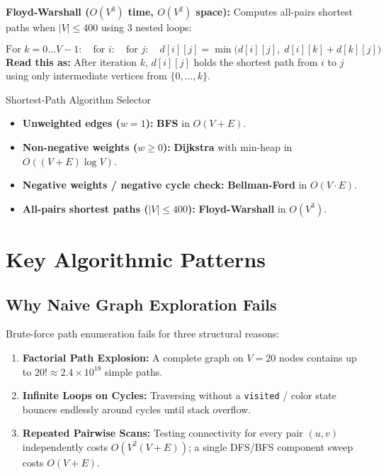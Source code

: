 \documentclass[11pt,a4paper]{article}
\theoremstyle{definition}
\begin{document}
\textbf{Floyd-Warshall ($O(V^3)$ time, $O(V^2)$ space):} Computes all-pairs shortest paths when $|V| \le 400$ using 3 nested loops:
\begin{formulabox}
$$\text{For } k = 0 \dots V-1:\quad \text{for } i:\quad \text{for } j:\quad d[i][j] = \min\big(d[i][j],\; d[i][k] + d[k][j]\big)$$
\textbf{Read this as:} After iteration $k$, $d[i][j]$ holds the shortest path from $i$ to $j$ using only intermediate vertices from $\{0, \dots, k\}$.
\end{formulabox}

\begin{calloutbox}{Shortest-Path Algorithm Selector}
\begin{itemize}
    \item \textbf{Unweighted edges ($w = 1$):} \textbf{BFS} in $O(V + E)$.
    \item \textbf{Non-negative weights ($w \ge 0$):} \textbf{Dijkstra} with min-heap in $O((V + E) \log V)$.
    \item \textbf{Negative weights / negative cycle check:} \textbf{Bellman-Ford} in $O(V \cdot E)$.
    \item \textbf{All-pairs shortest paths ($|V| \le 400$):} \textbf{Floyd-Warshall} in $O(V^3)$.
\end{itemize}
\end{calloutbox}

\section{Key Algorithmic Patterns}

\subsection{Why Naive Graph Exploration Fails}

Brute-force path enumeration fails for three structural reasons:
\begin{enumerate}
    \item \textbf{Factorial Path Explosion:} A complete graph on $V = 20$ nodes contains up to $20! \approx 2.4 \times 10^{18}$ simple paths.
    \item \textbf{Infinite Loops on Cycles:} Traversing without a \texttt{visited} / color state bounces endlessly around cycles until stack overflow.
    \item \textbf{Repeated Pairwise Scans:} Testing connectivity for every pair $(u, v)$ independently costs $O(V^2 (V + E))$; a single DFS/BFS component sweep costs $O(V + E)$.
\end{enumerate}
\end{document}
